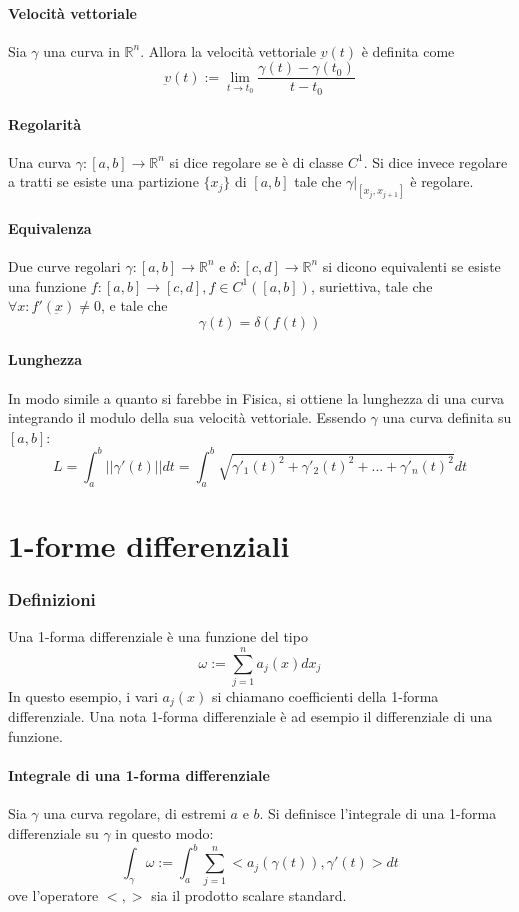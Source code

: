 \documentclass[a4paper,12pt]{article}
\begin{document}
\paragraph{Velocità vettoriale}
Sia $\gamma$ una curva in $\mathbb{R}^n$. Allora la velocità vettoriale $\underbar{v}(t)$ è definita come
$$\underbar{v}(t) := \lim_{t\to t_0} \dfrac{\gamma(t)-\gamma(t_0)}{t-t_0}$$

\paragraph{Regolarità}
Una curva $\gamma:[a,b]\rightarrow\mathbb{R}^n$ si dice regolare se è di classe $C^1$. Si dice invece regolare a tratti se esiste una partizione $\{x_j\}$ di $[a,b]$ tale che $\gamma|_{[x_j, x_{j+1}]}$ è regolare.
\paragraph{Equivalenza}
Due curve regolari $\gamma :[a,b]\rightarrow\mathbb{R}^n$ e $\delta :[c,d]\rightarrow\mathbb{R}^n$ si dicono equivalenti se esiste una funzione 
$f:[a,b]\rightarrow[c,d], f \in C^1([a,b])$, suriettiva, tale che $\forall x: f'(\underbar{x}) \neq 0$, e tale che
$$\gamma(t) = \delta(f(t))$$
\paragraph{Lunghezza}
In modo simile a quanto si farebbe in Fisica, si ottiene la lunghezza di una curva integrando il modulo della sua velocità vettoriale. Essendo $\gamma$ una curva definita su $[a, b]$:
$$L= \int_a^b ||\gamma'(t)|| dt = \int_a^b\sqrt{\gamma'_1(t)^2+\gamma'_2(t)^2+...+\gamma'_n(t)^2}dt$$


\section{1-forme differenziali}
\subsubsection{Definizioni}
Una 1-forma differenziale è una funzione del tipo
$$\omega := \sum_{j=1}^n a_j(x)dx_j$$
In questo esempio, i vari $a_j(x)$ si chiamano coefficienti della 1-forma differenziale.
Una nota 1-forma differenziale è ad esempio il differenziale di una funzione.
\paragraph{Integrale di una 1-forma differenziale}
Sia $\gamma$ una curva regolare, di estremi $a$ e $b$.
Si definisce l'integrale di una 1-forma differenziale su $\gamma$ in questo modo:
$$\int_\gamma \omega:=\int_a^b \sum_{j=1}^n <a_j(\gamma(t)), \gamma'(t)> dt$$
ove l'operatore $<,>$ sia il prodotto scalare standard.
\end{document}
